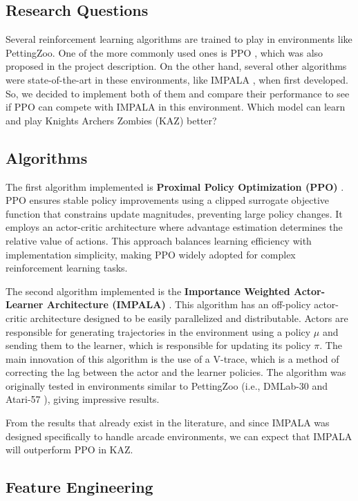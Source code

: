 \documentclass[12pt,a4paper, onecolumn]{exam}
\begin{document}
\subsection{Research Questions}
Several reinforcement learning algorithms are trained to play in environments like PettingZoo. One of the more commonly used ones is PPO \cite{albrecht},
which was also proposed in the project description. On the other hand, several other algorithms were state-of-the-art in these environments,
like IMPALA \cite{impala}, when first developed. So, we decided to implement both of them and compare their performance to see
if PPO can compete with IMPALA in this environment. Which model can learn and play Knights Archers Zombies (KAZ) better?

\subsection{Algorithms}
The first algorithm implemented is \textbf{Proximal Policy Optimization (PPO)} \cite{schulman2017}.
PPO ensures stable policy improvements using a clipped surrogate objective function that constrains update magnitudes,
preventing large policy changes.
It employs an actor-critic architecture where advantage estimation determines the relative value of actions.
This approach balances learning efficiency with implementation simplicity, making PPO widely adopted for complex reinforcement learning tasks.

The second algorithm implemented is the \textbf{Importance Weighted Actor-Learner Architecture (IMPALA)} \cite{impala}.
This algorithm has an off-policy actor-critic architecture designed to be easily parallelized and distributable. Actors are responsible for
generating trajectories in the environment using a policy $\mu$ and sending them to the learner, which is responsible for updating its policy $\pi$.
The main innovation of this algorithm is the use of a V-trace, which is a method of correcting the lag between the actor and the learner policies.
The algorithm was originally tested in environments similar to PettingZoo (i.e., DMLab-30 and Atari-57 \cite{impala}), giving impressive results.

From the results that already exist in the literature, and since IMPALA was designed specifically to handle arcade environments,
we can expect that IMPALA will outperform PPO in KAZ.

\subsection{Feature Engineering}
\end{document}

